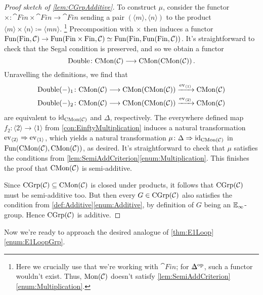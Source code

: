 \begin{proof}[Proof sketch of \cref{lem:CGrpAdditive}]
	To construct $\mu$, consider the functor $\times\colon  \cat{Fin}\times \cat{Fin}\rightarrow \cat{Fin}$ sending a pair $(\langle m\rangle,\langle n\rangle)$ to the product $\langle m\rangle \times\langle n\rangle \coloneqq \langle mn\rangle$.%
	\footnote{Here we crucially use that we're working with $\cat{Fin}$; for $\IDelta^\op$, such a functor wouldn't exist. Thus, $\mathrm{Mon}(\mathcal{C})$ doesn't satisfy \cref{lem:SemiAddCriterion}\cref{enum:Multiplication}.}
	Precomposition with $\times$ then induces a functor $\Fun\left(\cat{Fin},\Cc\right)\rightarrow \Fun\left(\cat{Fin}\times\cat{Fin},\Cc\right)\simeq \Fun\left(\cat{Fin},\Fun(\cat{Fin},\Cc)\right)$. It's straightforward to check that the Segal condition is preserved, and so we obtain a functor
	\begin{equation*}
		\operatorname{Double}\colon \cat{CMon}(\Cc)\longrightarrow\cat{CMon}\left(\cat{CMon}(\Cc)\right)\,.
	\end{equation*}
	Unravelling the definitions, we find that
	\begin{align*}
		\operatorname{Double}(-)_1\colon \cat{CMon}(\Cc) &\longrightarrow \cat{CMon}\left(\cat{CMon}(\Cc)\right)\xrightarrow{\ev_{\langle 1\rangle}}\cat{CMon}(\Cc)\\
		\operatorname{Double}(-)_2\colon \cat{CMon}(\Cc) &\longrightarrow \cat{CMon}\left(\cat{CMon}(\Cc)\right)\xrightarrow{\ev_{\langle 2\rangle}} \cat{CMon}(\Cc)
	\end{align*}
	are equivalent to $\operatorname{id}_{\mathrm{CMon}(\mathcal{C})}$ and $\Delta$, respectively. The everywhere defined map $f_2\colon \langle 2\rangle\rightarrow \langle 1\rangle$ from \cref{con:EinftyMultiplication} induces a natural transformation $\operatorname{ev}_{\langle 2\rangle}\Rightarrow \operatorname{ev}_{\langle 1\rangle}$, which yields a natural transformation $\mu\colon \Delta\Rightarrow \operatorname{id}_{\mathrm{CMon}(\mathcal{C})}$ in $\operatorname{Fun}(\mathrm{CMon}(\mathcal{C}),\mathrm{CMon}(\mathcal{C}))$, as desired. It's straightforward to check that $\mu$ satisfies the conditions from \cref{lem:SemiAddCriterion}\cref{enum:Multiplication}. This finishes the proof that $\mathrm{CMon}(\mathcal{C})$ is semi-additive.
	
	Since $\mathrm{CGrp}(\mathcal{C})\subseteq \mathrm{CMon}(\mathcal{C})$ is closed under products, it follows that $\mathrm{CGrp}(\mathcal{C})$ must be semi-additive too. But then every $G\in\mathrm{CGrp}(\mathcal{C})$ also satisfies the condition from \cref{def:Additive}\cref{enum:Additive}, by definition of $G$ being an $\mathbb{E}_\infty$-group. Hence $\mathrm{CGrp}(\mathcal{C})$ is additive.
\end{proof} 
Now we're ready to approach the desired analogue of \cref{thm:E1Loop}\cref{enum:E1LoopGrp}.
